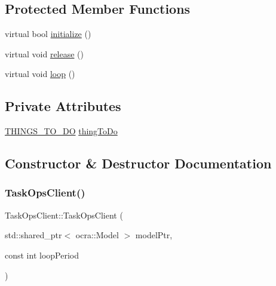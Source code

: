 \subsection*{Protected Member Functions}
\begin{DoxyCompactItemize}
\item 
virtual bool \hyperlink{classTaskOpsClient_a6f5e4c20c1d5f5df28dcc58e3cb4adb0}{initialize} ()
\item 
virtual void \hyperlink{classTaskOpsClient_af54d37bc4a2631c5c47e23d8156f6e95}{release} ()
\item 
virtual void \hyperlink{classTaskOpsClient_a7e7dfab7af0404f0b008da2844ab573e}{loop} ()
\end{DoxyCompactItemize}
\subsection*{Private Attributes}
\begin{DoxyCompactItemize}
\item 
\hyperlink{TaskOpsClient_8h_a0140057ae3fbe1db5f5c418dfc67d9db}{T\+H\+I\+N\+G\+S\+\_\+\+T\+O\+\_\+\+DO} \hyperlink{classTaskOpsClient_a3409c4ef6b396943397b5bd9237f0a40}{thing\+To\+Do}
\end{DoxyCompactItemize}


\subsection{Constructor \& Destructor Documentation}
\hypertarget{classTaskOpsClient_a6d3842de3255a78526ced7953428452c}{}\label{classTaskOpsClient_a6d3842de3255a78526ced7953428452c} 
\subsubsection{\texorpdfstring{Task\+Ops\+Client()}{TaskOpsClient()}}
{\footnotesize\ttfamily Task\+Ops\+Client\+::\+Task\+Ops\+Client (\begin{DoxyParamCaption}\item[{std\+::shared\+\_\+ptr$<$ ocra\+::\+Model $>$}]{model\+Ptr,  }\item[{const int}]{loop\+Period }\end{DoxyParamCaption})}

\hypertarget{classTaskOpsClient_a80a5c71dd04ab7a07d4ffb8116244cdd}{}\label{classTaskOpsClient_a80a5c71dd04ab7a07d4ffb8116244cdd} 
